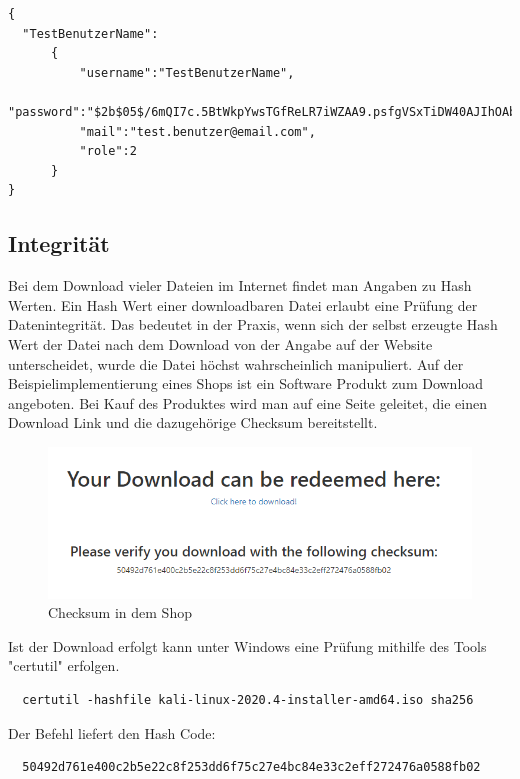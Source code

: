 \documentclass[utf8,biblatex]{lni}
\begin{document}
\begin{verbatim}
{
  "TestBenutzerName":
      {
          "username":"TestBenutzerName",
          "password":"$2b$05$/6mQI7c.5BtWkpYwsTGfReLR7iWZAA9.psfgVSxTiDW40AJIhOAbS",
          "mail":"test.benutzer@email.com",
          "role":2
      }
}
\end{verbatim}



\subsection{Integrität}

Bei dem Download vieler Dateien im Internet findet man Angaben zu Hash Werten. 
Ein Hash Wert einer downloadbaren Datei erlaubt eine Prüfung der Datenintegrität. 
Das bedeutet in der Praxis, wenn sich der selbst erzeugte Hash Wert der Datei nach dem Download 
von der Angabe auf der Website unterscheidet, wurde die Datei höchst wahrscheinlich manipuliert. 
Auf der Beispielimplementierung eines Shops ist ein Software Produkt zum Download angeboten. 
Bei Kauf des Produktes wird man auf eine Seite geleitet, die einen Download Link und die 
dazugehörige Checksum bereitstellt. 

\begin{figure}
  \centering
  \includegraphics[width=\textwidth]{images/checksum_pic2.png}
  \caption[Checksum in dem Shop]{Checksum in dem Shop} 
  \label{checksum-pic2}
\end{figure} 

Ist der Download erfolgt kann unter Windows eine Prüfung mithilfe des Tools "certutil" erfolgen. 

\begin{verbatim}
  certutil -hashfile kali-linux-2020.4-installer-amd64.iso sha256
\end{verbatim}

Der Befehl liefert den Hash Code: 

\begin{verbatim}
  50492d761e400c2b5e22c8f253dd6f75c27e4bc84e33c2eff272476a0588fb02
\end{verbatim}
\end{document}
